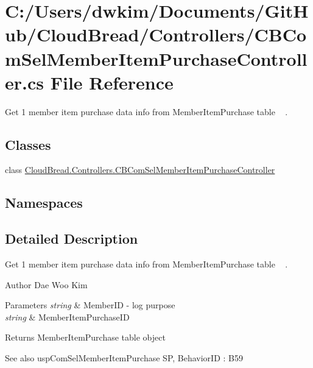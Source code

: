 \hypertarget{a00131}{}\section{C\+:/\+Users/dwkim/\+Documents/\+Git\+Hub/\+Cloud\+Bread/\+Controllers/\+C\+B\+Com\+Sel\+Member\+Item\+Purchase\+Controller.cs File Reference}
\label{a00131}


Get 1 member item purchase data info from Member\+Item\+Purchase table ~\newline
.  


\subsection*{Classes}
\begin{DoxyCompactItemize}
\item 
class \hyperlink{a00020}{Cloud\+Bread.\+Controllers.\+C\+B\+Com\+Sel\+Member\+Item\+Purchase\+Controller}
\end{DoxyCompactItemize}
\subsection*{Namespaces}
\begin{DoxyCompactItemize}
\end{DoxyCompactItemize}


\subsection{Detailed Description}
Get 1 member item purchase data info from Member\+Item\+Purchase table ~\newline
. 

\begin{DoxyAuthor}{Author}
Dae Woo Kim 
\end{DoxyAuthor}

\begin{DoxyParams}{Parameters}
{\em string} & Member\+ID -\/ log purpose \\
\hline
{\em string} & Member\+Item\+Purchase\+ID \\
\hline
\end{DoxyParams}
\begin{DoxyReturn}{Returns}
Member\+Item\+Purchase table object 
\end{DoxyReturn}
\begin{DoxySeeAlso}{See also}
usp\+Com\+Sel\+Member\+Item\+Purchase SP, Behavior\+ID \+: B59 
\end{DoxySeeAlso}
